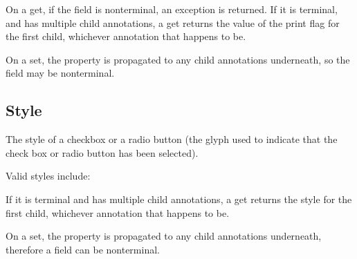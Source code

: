 \documentclass[letterpaper,12pt,english,openany,oneside]{sphinxmanual}
\begin{document}
On a get, if the field is non\sphinxhyphen{}terminal, an exception  is returned. If it is terminal, and has multiple child annotations, a get returns the value of the print flag for the first child, whichever annotation that happens to be.

On a set, the property is propagated to any child annotations underneath, so the field may be non\sphinxhyphen{}terminal.

\label{\detokenize{IAC_API_FormsIntro:syntax-27}}

\begin{sphinxVerbatim}[commandchars=\\\{\}]
\PYG{p}{[}\PYG{p}{]} 
\end{sphinxVerbatim}




\subsection{Style}
\label{\detokenize{IAC_API_FormsIntro:style}}
The style of a checkbox or a radio button (the glyph used to indicate that the check box or radio button has been selected).

Valid styles include:

\begin{sphinxVerbatim}[commandchars=\\\{\}]
\end{sphinxVerbatim}

If it is terminal and has multiple child annotations, a get returns the style for the first child, whichever annotation that happens to be.

On a set, the property is propagated to any child annotations underneath, therefore a field can be non\sphinxhyphen{}terminal.

\label{\detokenize{IAC_API_FormsIntro:syntax-28}}

\begin{sphinxVerbatim}[commandchars=\\\{\}]
\PYG{p}{[}\PYG{p}{]} 
\end{sphinxVerbatim}
\label{\detokenize{IAC_API_FormsIntro:exceptions-14}}
\end{document}
